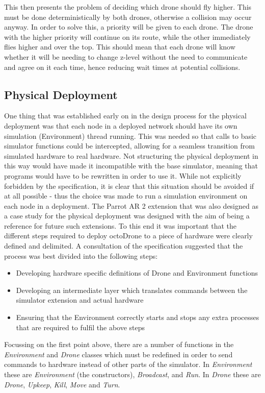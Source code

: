 This then presents the problem of deciding which drone should fly higher. This must be done deterministically by both drones, otherwise a collision may occur anyway. In order to solve this, a priority will be given to each drone. The drone with the higher priority will continue on its route, while the other immediately flies higher and over the top. This should mean that each drone will know whether it will be needing to change z-level without the need to communicate and agree on it each time, hence reducing wait times at potential collisions.

\subsection{Physical Deployment}
One thing that was established early on in the design process for the physical deployment was that each node in a deployed network should have its own simulation (Environment) thread running. This was needed so that calls to basic simulator functions could be intercepted, allowing for a seamless transition from simulated hardware to real hardware. Not structuring the physical deployment in this way would have made it incompatible with the base simulator, meaning that programs would have to be rewritten in order to use it. While not explicitly forbidden by the specification, it is clear that this situation should be avoided if at all possible - thus the choice was made to run a simulation environment on each node in a deployment. The Parrot AR 2 extension that was also designed as a case study for the physical deployment was designed with the aim of being a reference for future such extensions. To this end it was important that the different steps required to deploy octoDrone to a piece of hardware were clearly defined and delimited. A consultation of the specification suggested that the process was best divided into the following steps:

\begin{itemize}
\item Developing hardware specific definitions of Drone and Environment functions
\item Developing an intermediate layer which translates commands between the simulator extension and actual hardware
\item Ensuring that the Environment correctly starts and stops any extra processes that are required to fulfil the above steps
\end{itemize}

Focussing on the first point above, there are a number of functions in the \textit{Environment} and \textit{Drone} classes which must be redefined in order to send commands to hardware instead of other parts of the simulator. In \textit{Environment} these are \textit{Environment} (the constructors), \textit{Broadcast}, and \textit{Run}. In \textit{Drone} these are \textit{Drone}, \textit{Upkeep}, \textit{Kill}, \textit{Move} and \textit{Turn}.

